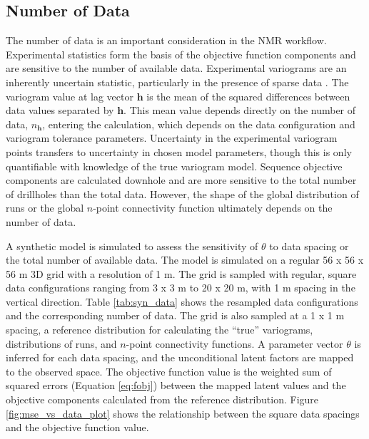 \FloatBarrier
\subsection{Number of Data}
\label{subsec:04ndata}

The number of data is an important consideration in the \gls{NMR} workflow. Experimental statistics form the basis of the objective function components and are sensitive to the number of available data. Experimental variograms are an inherently uncertain statistic, particularly in the presence of sparse data \citep{ortiz2002calculation,pardo-iguzquiza2012varboot}. The variogram value at lag vector $\mathbf{h}$ is the mean of the squared differences between data values separated by $\mathbf{h}$. This mean value depends directly on the number of data, $n_{\mathbf{h}}$, entering the calculation, which depends on the data configuration and variogram tolerance parameters. Uncertainty in the experimental variogram points transfers to uncertainty in chosen model parameters, though this is only quantifiable with knowledge of the true variogram model. Sequence objective components are calculated downhole and are more sensitive to the total number of drillholes than the total data. However, the shape of the global distribution of runs or the global $n$-point connectivity function ultimately depends on the number of data.

A synthetic model is simulated to assess the sensitivity of $\theta$ to data spacing or the total number of available data. The model is simulated on a regular 56 x 56 x 56 m \gls{3D} grid with a resolution of 1 m. The grid is sampled with regular, square data configurations ranging from 3 x 3 m to 20 x 20 m, with 1 m spacing in the vertical direction. Table \ref{tab:syn_data} shows the resampled data configurations and the corresponding number of data. The grid is also sampled at a 1 x 1 m spacing, a reference distribution for calculating the ``true'' variograms, distributions of runs, and $n$-point connectivity functions. A parameter vector $\theta$ is inferred for each data spacing, and the unconditional latent factors are mapped to the observed space. The objective function value is the weighted sum of squared errors (Equation \ref{eq:fobj}) between the mapped latent values and the objective components calculated from the reference distribution. Figure \ref{fig:mse_vs_data_plot} shows the relationship between the square data spacings and the objective function value.

